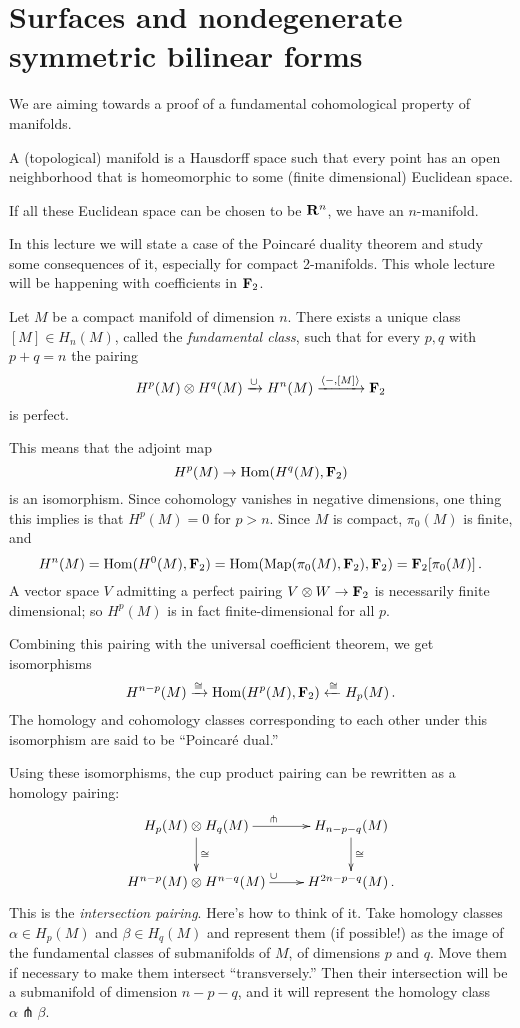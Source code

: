 \section{Surfaces and nondegenerate symmetric bilinear forms}

We are aiming towards a proof of a fundamental cohomological property of
manifolds. 

\begin{definition} A (topological) manifold is a Hausdorff space such that
every point has an open neighborhood that is homeomorphic to some (finite
dimensional) Euclidean space. 
\end{definition}

If all these Euclidean space can be chosen to be $\mathbf R^n$, we have an 
$n$-manifold. 

In this lecture we will state a case of the Poincar\'e duality theorem
and study some consequences of it, especially for compact 2-manifolds. 
This whole lecture will be happening with coefficients in $\mathbf F_2$. 

\begin{theorem}
Let $M$ be a compact manifold of dimension $n$.  
There exists a unique class $[M]\in H_n(M)$, called the {\em fundamental class}, such that for every $p,q$ with $p+q=n$ the pairing 
\[
H^p(M)\otimes H^q(M)\xrightarrow{\cup} H^n(M)\xrightarrow{\langle -,[M]\rangle}\mathbf F_2
\]
is perfect. 
\end{theorem}
This means that the adjoint map
\[
H^p(M)\to\operatorname{Hom}(H^q(M),\mathbf F_2)
\]
is an isomorphism. Since cohomology vanishes in negative dimensions, one thing
this implies is that $H^p(M)=0$ for $p>n$. Since $M$ is compact, $\pi_0(M)$
is finite, and 
\[
H^n(M)=\operatorname{Hom}(H^0(M),\mathbf F_2)=\operatorname{Hom}(\operatorname{Map}(\pi_0(M),\mathbf F_2),\mathbf F_2)=\mathbf F_2[\pi_0(M)]\,.
\]
A vector space $V$ admitting a perfect pairing $V\otimes W\to\mathbf F_2$
is necessarily finite dimensional; so $H^p(M)$ is in fact finite-dimensional 
for all $p$.

Combining this pairing with the universal coefficient theorem, we get 
isomorphisms
\[
H^{n-p}(M)\xrightarrow{\cong}\operatorname{Hom}(H^p(M),\mathbf F_2)\xleftarrow{\cong}H_p(M)\,.
\]
The homology and cohomology classes corresponding to each other under this 
isomorphism are said to be ``Poincar\'e dual.'' 

Using these isomorphisms, the cup product pairing can be rewritten as a
homology pairing:
\[
\xymatrix{
H_p(M)\otimes H_q(M) \ar[r]^\pitchfork \ar[d]^\cong & 
H_{n-p-q}(M) \ar[d]^\cong \\
H^{n-p}(M)\otimes H^{n-q}(M) \ar[r]^\cup & H^{2n-p-q}(M)\,.
}\]
This is the {\em intersection pairing}. Here's how to think of it. 
Take homology classes $\alpha\in H_p(M)$ and $\beta\in H_q(M)$ and
represent them (if possible!) as the image of the fundamental classes
of submanifolds of $M$, of dimensions $p$ and $q$. 
Move them if necessary to make them intersect ``transversely.''
Then their intersection will be a submanifold of dimension
$n-p-q$, and it will represent the homology class $\alpha\pitchfork\beta$.

